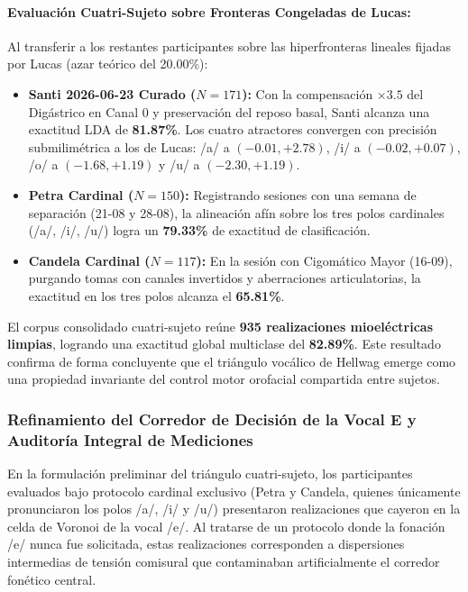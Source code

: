 \documentclass[11pt,a4paper,openany]{book}
\theoremstyle{definition}
\begin{document}
\paragraph{Evaluación Cuatri-Sujeto sobre Fronteras Congeladas de Lucas:}
Al transferir a los restantes participantes sobre las hiperfronteras lineales fijadas por Lucas (azar teórico del 20.00\%):
\begin{itemize}
    \item \textbf{Santi 2026-06-23 Curado ($N=171$):} Con la compensación $\times 3.5$ del Digástrico en Canal 0 y preservación del reposo basal, Santi alcanza una exactitud LDA de \textbf{81.87\%}. Los cuatro atractores convergen con precisión submilimétrica a los de Lucas: /a/ a $(-0.01, +2.78)$, /i/ a $(-0.02, +0.07)$, /o/ a $(-1.68, +1.19)$ y /u/ a $(-2.30, +1.19)$.
    \item \textbf{Petra Cardinal ($N=150$):} Registrando sesiones con una semana de separación (21-08 y 28-08), la alineación afín sobre los tres polos cardinales (/a/, /i/, /u/) logra un \textbf{79.33\%} de exactitud de clasificación.
    \item \textbf{Candela Cardinal ($N=117$):} En la sesión con Cigomático Mayor (16-09), purgando tomas con canales invertidos y aberraciones articulatorias, la exactitud en los tres polos alcanza el \textbf{65.81\%}.
\end{itemize}

El corpus consolidado cuatri-sujeto reúne \textbf{935 realizaciones mioeléctricas limpias}, logrando una exactitud global multiclase del \textbf{82.89\%}. Este resultado confirma de forma concluyente que el triángulo vocálico de Hellwag emerge como una propiedad invariante del control motor orofacial compartida entre sujetos.

\subsubsection{Refinamiento del Corredor de Decisión de la Vocal E y Auditoría Integral de Mediciones}
\label{subsec:refinamiento_corredor_e_auditoria}

En la formulación preliminar del triángulo cuatri-sujeto, los participantes evaluados bajo protocolo cardinal exclusivo (Petra y Candela, quienes únicamente pronunciaron los polos /a/, /i/ y /u/) presentaron realizaciones que cayeron en la celda de Voronoi de la vocal /e/. Al tratarse de un protocolo donde la fonación /e/ nunca fue solicitada, estas realizaciones corresponden a dispersiones intermedias de tensión comisural que contaminaban artificialmente el corredor fonético central.
\end{document}
